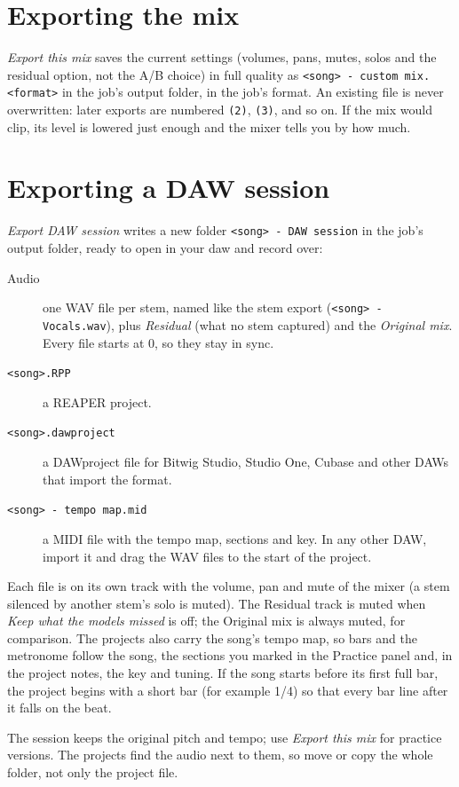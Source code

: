 \documentclass{covermaker}
\begin{document}
\section{Exporting the mix}
\emph{Export this mix} saves the current settings (volumes, pans, mutes, solos
and the residual option, not the A/B choice) in full quality as
\texttt{<song> - custom mix.<format>} in the job's output folder, in the job's
format. An existing file is never overwritten: later exports are numbered
\texttt{(2)}, \texttt{(3)}, and so on. If the mix would clip, its level is
lowered just enough and the mixer tells you by how much.

\section{Exporting a DAW session}\label{sec:daw-session}
\emph{Export DAW session} writes a new folder \texttt{<song> - DAW session} in
the job's output folder, ready to open in your \gls{daw} and record over:
\begin{description}
  \item[Audio] one WAV file per stem, named like the stem export
  (\texttt{<song> - Vocals.wav}), plus \emph{Residual} (what no stem captured)
  and the \emph{Original mix}. Every file starts at 0, so they stay in sync.
  \item[\texttt{<song>.RPP}] a REAPER project.
  \item[\texttt{<song>.dawproject}] a DAWproject file for Bitwig Studio,
  Studio One, Cubase and other DAWs that import the format.
  \item[\texttt{<song> - tempo map.mid}] a MIDI file with the tempo map,
  sections and key. In any other DAW, import it and drag the WAV files to the
  start of the project.
\end{description}
Each file is on its own track with the volume, pan and mute of the mixer (a
stem silenced by another stem's solo is muted). The Residual track is muted
when \emph{Keep what the models missed} is off; the Original mix is always
muted, for comparison. The projects also carry the song's tempo map, so bars
and the metronome follow the song, the sections you marked in the Practice
panel and, in the project notes, the key and tuning. If the song starts before
its first full bar, the project begins with a short bar (for example 1/4) so
that every bar line after it falls on the beat.

The session keeps the original pitch and tempo; use \emph{Export this mix} for
practice versions. The projects find the audio next to them, so move or copy
the whole folder, not only the project file.
\end{document}
